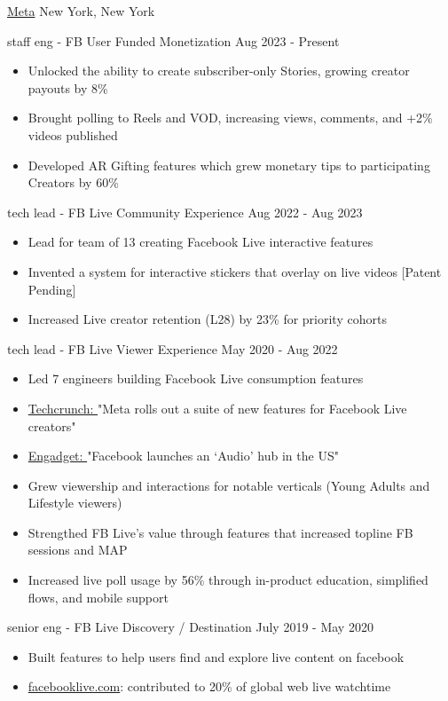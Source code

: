 \documentclass[11pt]{article}
\begin{document}
\headedsection  %
{\href{http://www.about.fb.com/}{Meta}}
{New York, New York}
{
    \headedsubsection
    {staff eng - FB User Funded Monetization }
    {Aug 2023 - Present}
    {
        \begin{itemize}
            \item Unlocked the ability to create subscriber-only Stories, growing creator payouts by 8\%
            \item Brought polling to Reels and VOD, increasing views, comments, and +2\% videos published
            \item Developed AR Gifting features which grew monetary tips to participating Creators by 60\%
        \end{itemize}
    }
    \headedsubsection
    {tech lead - FB Live Community Experience}
    {Aug 2022 - Aug 2023}
    {
        \begin{itemize}
            \item Lead for team of 13 creating Facebook Live interactive features
            \item Invented a system for interactive stickers that overlay on live videos [Patent Pending]
            \item Increased Live creator retention (L28) by 23\% for priority cohorts
        \end{itemize}
    }
    \headedsubsection
    {tech lead - FB Live Viewer Experience}
    {May 2020 - Aug 2022}
    {
        \begin{itemize}
            \item Led 7 engineers building Facebook Live consumption features
            \item 
                \href{https://techcrunch.com/2021/12/09/meta-rolls-out-a-suite-of-new-features-and-discovery-tools-for-facebook-live-creators}{Techcrunch: }
                "Meta rolls out a suite of new features for Facebook Live creators"
            \item 
                \href{https://www.engadget.com/facebook-audio-content-hub-live-audio-rooms-podcasts-170633543.html}
                {Engadget: }
                "Facebook launches an ‘Audio’ hub in the US"
            \item Grew viewership and interactions for notable verticals (Young Adults and Lifestyle viewers)
            \item Strengthed FB Live's value through features that increased topline FB sessions and MAP
            \item Increased live poll usage by 56\% through in-product education, simplified flows, and mobile support
        \end{itemize}
    }
    \headedsubsection
    {senior eng - FB Live Discovery / Destination} 
    {July 2019 - May 2020}
    {
        \begin{itemize}
            \item Built features to help users find and explore live content on facebook 
            \item {\href{http://www.facebooklive.com/}{facebooklive.com}}: contributed to 20\% of global web live watchtime
        \end{itemize}

}}
\end{document}
